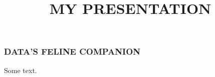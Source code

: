 \documentclass{beamer}
\begin{document}
\title{MY PRESENTATION}

\begin{frame}
  \frametitle{DATA'S FELINE COMPANION}
  Some text.
\end{frame}
\end{document}
